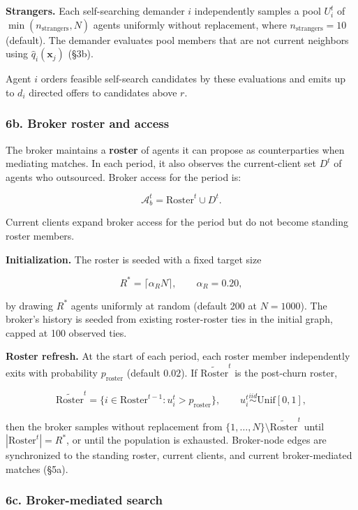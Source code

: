 \documentclass[11pt]{article}
\begin{document}
\textbf{Strangers.} Each self-searching demander \(i\) independently samples a pool \(U_i^t\) of \(\min(n_{\mathrm{strangers}}, N)\) agents uniformly without replacement, where \(n_{\mathrm{strangers}} = 10\) (default). The demander evaluates pool members that are not current neighbors using \(\hat{q}_i(\mathbf{x}_j)\) (§3b).

Agent \(i\) orders feasible self-search candidates by these evaluations and emits up to \(d_i\) directed offers to candidates above \(r\).

\subsubsection{6b. Broker roster and access}\label{b.-broker-roster-and-access}

The broker maintains a \textbf{roster} of agents it can propose as counterparties when mediating matches. In each period, it also observes the current-client set \(D^t\) of agents who outsourced. Broker access for the period is:

\[\mathcal{A}_b^t = \text{Roster}^t \cup D^t.\]

Current clients expand broker access for the period but do not become standing roster members.

\textbf{Initialization.} The roster is seeded with a fixed target size

\[R^* = \lceil \alpha_R N \rceil, \qquad \alpha_R = 0.20,\]

by drawing \(R^*\) agents uniformly at random (default 200 at \(N = 1000\)). The broker's history is seeded from existing roster-roster ties in the initial graph, capped at 100 observed ties.

\textbf{Roster refresh.} At the start of each period, each roster member independently exits with probability \(p_{\text{roster}}\) (default \(0.02\)). If \(\widetilde{\text{Roster}}^t\) is the post-churn roster,

\[\widetilde{\text{Roster}}^t = \{i \in \text{Roster}^{t-1} : u_i^t > p_{\text{roster}}\}, \qquad u_i^t \overset{iid}{\sim} \mathrm{Unif}[0,1],\]

then the broker samples without replacement from \(\{1,\ldots,N\}\setminus \widetilde{\text{Roster}}^t\) until \(|\text{Roster}^t| = R^*\), or until the population is exhausted. Broker-node edges are synchronized to the standing roster, current clients, and current broker-mediated matches (§5a).

\subsubsection{6c. Broker-mediated search}\label{c.-broker-mediated-search}
\end{document}
